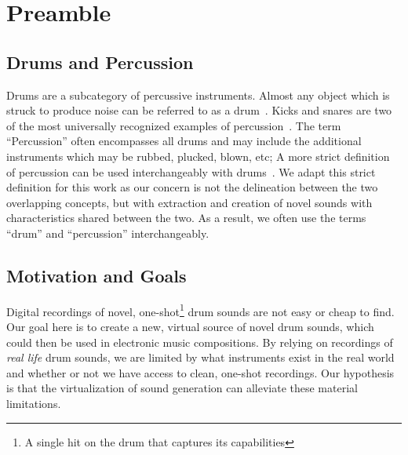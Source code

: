 \documentclass[runningheads,a4paper]{llncs}
\begin{document}
\section{Preamble}
\subsection{Drums and Percussion}
Drums are a subcategory of percussive instruments. Almost any object which is struck to produce noise can be referred to as a drum~\cite{latham2002oxford}. Kicks and snares are two of the most universally recognized examples of percussion~\cite{barry2005drum}. The term \enquote{Percussion} often encompasses all drums and may include the additional instruments which may be rubbed, plucked, blown, etc; A more strict definition of percussion can be used interchangeably with drums~\cite{latham2002oxford}. We adapt this strict definition for this work as our concern is not the delineation between the two overlapping concepts, but with extraction and creation of novel sounds with characteristics shared between the two. As a result, we often use the terms \enquote{drum} and \enquote{percussion} interchangeably.

\subsection{Motivation and Goals}
Digital recordings of novel, one-shot\footnote{A single hit on the drum that captures its capabilities} drum sounds are not easy or cheap to find. Our goal here is to create a new, virtual source of novel drum sounds, which could then be used in electronic music compositions. By relying on recordings of \textit{real life} drum sounds, we are limited by what instruments exist in the real world and whether or not we have access to clean, one-shot recordings. Our hypothesis is that the virtualization of sound generation can alleviate these material limitations.
\end{document}
